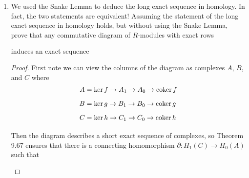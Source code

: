 \documentclass[11pt,oneside,english]{amsart}
\theoremstyle{definition}
\newcommand{\coker}{\text{coker\,}}
\begin{document}
\begin{enumerate}[leftmargin=*]
\item We used the Snake Lemma to deduce the long exact sequence in homology. In fact, the two statements are equivalent! Assuming the statement of the long exact sequence in homology holds, but without using the Snake Lemma, prove that any commutative diagram of $R$-modules with exact rows
\begin{center}
\end{center}
induces an exact sequence
\begin{center}
\end{center}

\begin{proof}
First note we can view the columns of the diagram as complexes $A$, $B$, and $C$ where
\begin{align*}
A&=\ker f\to A_1\to A_0\to \coker f\\[2mm]
B&=\ker g\to B_1\to B_0\to \coker g\\[2mm]
C&=\ker h\to C_1\to C_0\to \coker h\\[2mm]
\end{align*}
Then the diagram describes a short exact sequence of complexes, so Theorem 9.67 ensures that there is a connecting homomorphism $\partial :H_1(C)\to H_{0}(A)$ such that 
\begin{center}
\end{center}


\end{proof}
\end{enumerate}
\end{document}
